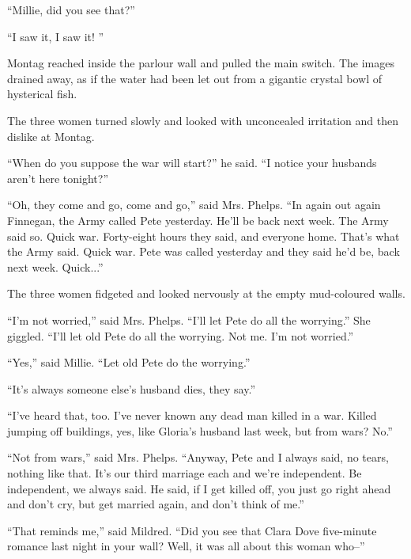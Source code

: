 \documentclass[11pt,openany]{book}
\begin{document}
``Millie, did you see that?''

``I saw it, I saw it! ''

Montag reached inside the parlour wall and pulled the main switch. The images drained away, as if the water had been let out from a gigantic crystal bowl of hysterical fish.

The three women turned slowly and looked with unconcealed irritation and then dislike at Montag.

``When do you suppose the war will start?'' he said. ``I notice your husbands aren't here tonight?''

``Oh, they come and go, come and go,'' said Mrs. Phelps. ``In again out again Finnegan, the Army called Pete yesterday. He'll be back next week. The Army said so. Quick war. Forty-eight hours they said, and everyone home. That's what the Army said. Quick war. Pete was called yesterday and they said he'd be, back next week. Quick...''

The three women fidgeted and looked nervously at the empty mud-coloured walls.

``I'm not worried,'' said Mrs. Phelps. ``I'll let Pete do all the worrying.'' She giggled. ``I'll let old Pete do all the worrying. Not me. I'm not worried.''

``Yes,'' said Millie. ``Let old Pete do the worrying.''

``It's always someone else's husband dies, they say.''

``I've heard that, too. I've never known any dead man killed in a war. Killed jumping off buildings, yes, like Gloria's husband last week, but from wars? No.''

``Not from wars,'' said Mrs. Phelps. ``Anyway, Pete and I always said, no tears, nothing like that. It's our third marriage each and we're independent. Be independent, we always said. He said, if I get killed off, you just go right ahead and don't cry, but get married again, and don't think of me.''

``That reminds me,'' said Mildred. ``Did you see that Clara Dove five-minute romance last night in your wall? Well, it was all about this woman who--''
\end{document}
